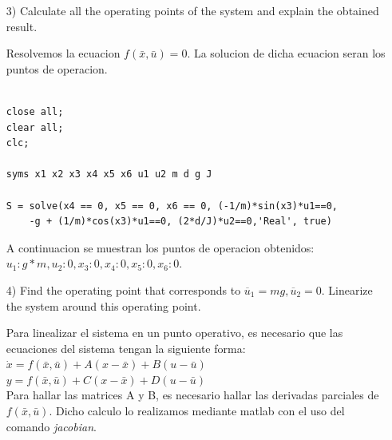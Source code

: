 \documentclass{article}
\begin{document}
\begin{itemize}
\bigskip

\item[3)] 
{\color{gray}
Calculate all the operating points of the system and explain the obtained result.
}

\bigskip

Resolvemos la ecuacion $f(\bar{x},\bar{u}) = 0$. La solucion de dicha ecuacion seran los puntos de operacion.

\bigskip

\begin{tcolorbox}
[
title={File \texttt{answer\_3.m}}      
]
\begin{scriptsize}
\begin{verbatim}

close all;
clear all;
clc;

syms x1 x2 x3 x4 x5 x6 u1 u2 m d g J

S = solve(x4 == 0, x5 == 0, x6 == 0, (-1/m)*sin(x3)*u1==0,
	-g + (1/m)*cos(x3)*u1==0, (2*d/J)*u2==0,'Real', true)

\end{verbatim}
\end{scriptsize}
\end{tcolorbox}

\bigskip

A continuacion se muestran los puntos de operacion obtenidos: $u_1: g*m, u_2: 0, x_3: 0, x_4: 0, x_5: 0, x_6: 0$.

\bigskip

\item[4)] 
{\color{gray}
Find the operating point that corresponds to $\overline{u}_1 = m g, \overline{u}_2 = 0$. Linearize the system around this operating point.
}

\bigskip

Para linealizar el sistema en un punto operativo, es necesario que las ecuaciones del sistema tengan la siguiente forma:\\
	$\dot{x} = f(\bar{x},\bar{u}) + A(x-\bar{x}) + B(u-\bar{u})$\\
	$y = f(\bar{x},\bar{u}) + C(x-\bar{x}) + D(u-\bar{u})$\\
	
Para hallar las matrices A y B, es necesario hallar las derivadas parciales de $f(\bar{x},\bar{u})$. Dicho calculo lo realizamos mediante matlab con el uso del comando \textit{jacobian}.

\bigskip


\begin{tcolorbox}
[
title={File \texttt{answer\_4.m}}    
]
\begin{scriptsize}
\begin{verbatim}


\end{verbatim}
\end{scriptsize}
\end{tcolorbox}
\end{itemize}
\end{document}
